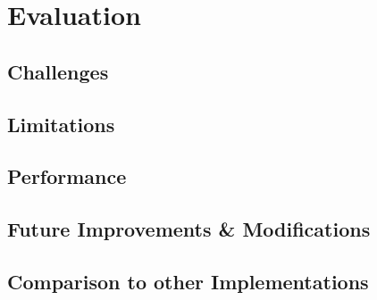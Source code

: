 \chapter{Evaluation}

\section{Challenges}

\section{Limitations}

\section{Performance}

\section{Future Improvements \& Modifications}

\section{Comparison to other Implementations}

